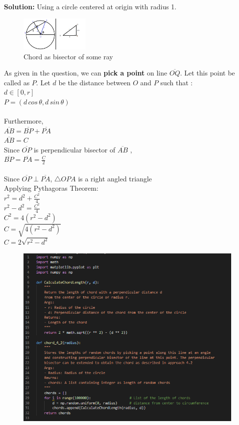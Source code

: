 \documentclass[answers]{exam}
\begin{document}
\begin{framed}
\textbf{Solution:}
Using a circle centered at origin with radius 1. 
\begin{figure}[H] %
    \centering
    \includegraphics[width= 0.3\textwidth]{Q4.2_working.PNG}
    \caption{Chord as bisector of some ray}
\end{figure}
As given in the question, we can \textbf{pick a point} on line $\overline{OQ}$. Let this point be called as $P$. Let $d$ be the distance between $O$ and $P$ such that :\\
$d \in [0, r]$\\
$P = (d \, cos \, \theta , d \, sin \, \theta)$\\\\
Furthermore, \\
$\overline{AB} = \overline{BP} + \overline{PA}$\\
$\overline{AB} = C$\\
Since $\overline{OP}$ is perpendicular bisector of $\overline{AB}$ ,\\
$ \overline{BP} = \overline{PA} = \frac{C}{2}$\\\\
Since $\overline{OP} \perp \overline{PA}$,  $\triangle OPA $ is a right angled triangle \\
Applying Pythagoras Theorem: \\
$r^2 = d^2 + \frac{C^2}{4}$\\
$r^2 - d^2 = \frac{C^2}{4}$\\
$C^2 = 4(r^2 - d^2)$\\
$C = \sqrt{4(r^2 - d^2)}$\\
$C = 2 \sqrt{r^2 - d^2}$\\

\begin{figure}[H] %
    \centering
    \includegraphics[width= 1\textwidth]{Q4.2_code_1.PNG}
\end{figure}


\end{framed}
\end{document}
